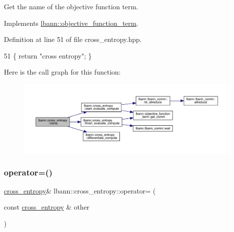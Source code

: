 Get the name of the objective function term. 

Implements \hyperlink{classlbann_1_1objective__function__term_a964fbfad3dd0434aa8f32c5fedf1079a}{lbann\+::objective\+\_\+function\+\_\+term}.



Definition at line 51 of file cross\+\_\+entropy.\+hpp.


\begin{DoxyCode}
51 \{ \textcolor{keywordflow}{return} \textcolor{stringliteral}{"cross entropy"}; \}
\end{DoxyCode}
Here is the call graph for this function\+:\nopagebreak
\begin{figure}[H]
\begin{center}
\leavevmode
\includegraphics[width=350pt]{classlbann_1_1cross__entropy_a142c9188b0a251ddaf0325e1f310f205_cgraph}
\end{center}
\end{figure}
\mbox{\label{classlbann_1_1cross__entropy_a818f473e9af3e417dfdf2c79f8f2c2af}} 
\subsubsection{\texorpdfstring{operator=()}{operator=()}}
{\footnotesize\ttfamily \hyperlink{classlbann_1_1cross__entropy}{cross\+\_\+entropy}\& lbann\+::cross\+\_\+entropy\+::operator= (\begin{DoxyParamCaption}\item[{const \hyperlink{classlbann_1_1cross__entropy}{cross\+\_\+entropy} \&}]{other }\end{DoxyParamCaption})\hspace{0.3cm}{\ttfamily [default]}}

